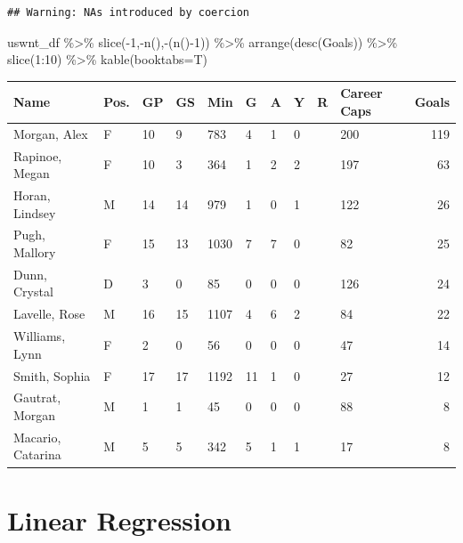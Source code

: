 \documentclass[
  11pt,
]{book}
\newenvironment{Shaded}{\begin{snugshade}}{\end{snugshade}}
\newcommand{\AttributeTok}[1]{\textcolor[rgb]{0.77,0.63,0.00}{#1}}
\newcommand{\DecValTok}[1]{\textcolor[rgb]{0.00,0.00,0.81}{#1}}
\newcommand{\FunctionTok}[1]{\textcolor[rgb]{0.00,0.00,0.00}{#1}}
\newcommand{\NormalTok}[1]{#1}
\newcommand{\SpecialCharTok}[1]{\textcolor[rgb]{0.00,0.00,0.00}{#1}}
\theoremstyle{definition}
\theoremstyle{definition}
\theoremstyle{definition}
\theoremstyle{definition}
\theoremstyle{remark}
\begin{document}
\begin{verbatim}
## Warning: NAs introduced by coercion
\end{verbatim}

\begin{Shaded}
\begin{Highlighting}[]
\NormalTok{uswnt\_df }\SpecialCharTok{\%\textgreater{}\%} 
  \FunctionTok{slice}\NormalTok{(}\SpecialCharTok{{-}}\DecValTok{1}\NormalTok{,}\SpecialCharTok{{-}}\FunctionTok{n}\NormalTok{(),}\SpecialCharTok{{-}}\NormalTok{(}\FunctionTok{n}\NormalTok{()}\SpecialCharTok{{-}}\DecValTok{1}\NormalTok{)) }\SpecialCharTok{\%\textgreater{}\%} 
  \FunctionTok{arrange}\NormalTok{(}\FunctionTok{desc}\NormalTok{(Goals)) }\SpecialCharTok{\%\textgreater{}\%} 
  \FunctionTok{slice}\NormalTok{(}\DecValTok{1}\SpecialCharTok{:}\DecValTok{10}\NormalTok{) }\SpecialCharTok{\%\textgreater{}\%} 
  \FunctionTok{kable}\NormalTok{(}\AttributeTok{booktabs=}\NormalTok{T)}
\end{Highlighting}
\end{Shaded}

\begin{tabular}{llllllllllr}
\toprule
Name & Pos. & GP & GS & Min & G & A & Y & R & Career Caps & Goals\\
\midrule
Morgan, Alex & F & 10 & 9 & 783 & 4 & 1 & 0 &  & 200 & 119\\
Rapinoe, Megan & F & 10 & 3 & 364 & 1 & 2 & 2 &  & 197 & 63\\
Horan, Lindsey & M & 14 & 14 & 979 & 1 & 0 & 1 &  & 122 & 26\\
Pugh, Mallory & F & 15 & 13 & 1030 & 7 & 7 & 0 &  & 82 & 25\\
Dunn, Crystal & D & 3 & 0 & 85 & 0 & 0 & 0 &  & 126 & 24\\
\addlinespace
Lavelle, Rose & M & 16 & 15 & 1107 & 4 & 6 & 2 &  & 84 & 22\\
Williams, Lynn & F & 2 & 0 & 56 & 0 & 0 & 0 &  & 47 & 14\\
Smith, Sophia & F & 17 & 17 & 1192 & 11 & 1 & 0 &  & 27 & 12\\
Gautrat, Morgan & M & 1 & 1 & 45 & 0 & 0 & 0 &  & 88 & 8\\
Macario, Catarina & M & 5 & 5 & 342 & 5 & 1 & 1 &  & 17 & 8\\
\bottomrule
\end{tabular}

\hypertarget{linear-regression}{%
\chapter{Linear Regression}\label{linear-regression}}
\end{document}
